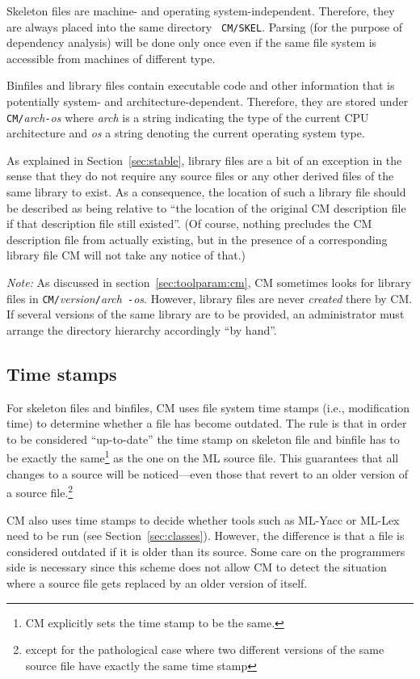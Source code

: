 \documentclass[titlepage,letterpaper]{article}
\begin{document}
Skeleton files are machine- and operating system-independent.
Therefore, they are always placed into the same directory {\tt
CM/SKEL}. Parsing (for the purpose of dependency analysis) will be
done only once even if the same file system is accessible from
machines of different type.

Binfiles and library files contain executable code and other
information that is potentially system- and architecture-dependent.
Therefore, they are stored under {\tt CM/}{\it arch}{\tt -}{\it os}
where {\it arch} is a string indicating the type of the current
CPU architecture and {\it os} a string denoting the current operating
system type.

As explained in Section~\ref{sec:stable}, library files are a bit of
an exception in the sense that they do not require any source files or
any other derived files of the same library to exist.  As a
consequence, the location of such a library file should be described
as being relative to ``the location of the original CM description
file if that description file still existed''.  (Of course, nothing
precludes the CM description file from actually existing, but in the
presence of a corresponding library file CM will not take any notice
of that.)

{\em Note:} As discussed in section~\ref{sec:toolparam:cm}, CM sometimes
looks for library files in {\tt CM/}{\it version}{\tt /}{\it arch}{\tt
-}{\it os}.  However, library files are never {\em created} there by
CM.  If several versions of the same library are to be provided, an
administrator must arrange the directory hierarchy accordingly ``by
hand''.

\subsection{Time stamps}

For skeleton files and binfiles, CM uses file system time stamps
(i.e., modification time) to determine whether a file has become
outdated.  The rule is that in order to be considered ``up-to-date''
the time stamp on skeleton file and binfile has to be exactly the
same\footnote{CM explicitly sets the time stamp to be the same.} as
the one on the ML source file.  This guarantees that all changes to a
source will be noticed---even those that revert to an older version of
a source file.\footnote{except for the pathological case where two
different versions of the same source file have exactly the same time
stamp}

CM also uses time stamps to decide whether tools such as ML-Yacc or
ML-Lex need to be run (see Section~\ref{sec:classes}).  However, the
difference is that a file is considered outdated if it is older than
its source.  Some care on the programmers side is necessary since this
scheme does not allow CM to detect the situation where a source file
gets replaced by an older version of itself.
\end{document}
